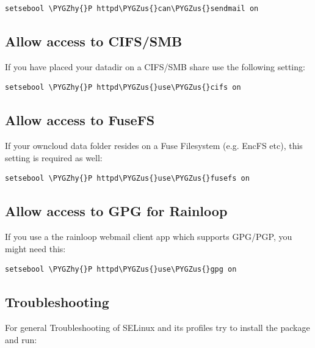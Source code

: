 \documentclass[letterpaper,10pt,english]{sphinxmanual}
\def\PYGZus{\char`\_}
\def\PYGZhy{\char`\-}
\begin{document}
\begin{Verbatim}[commandchars=\\\{\}]
setsebool \PYGZhy{}P httpd\PYGZus{}can\PYGZus{}sendmail on
\end{Verbatim}


\subsection{Allow access to CIFS/SMB}
\label{installation/selinux_configuration:allow-access-to-cifs-smb}
If you have placed your datadir on a CIFS/SMB share use the following setting:

\begin{Verbatim}[commandchars=\\\{\}]
setsebool \PYGZhy{}P httpd\PYGZus{}use\PYGZus{}cifs on
\end{Verbatim}


\subsection{Allow access to FuseFS}
\label{installation/selinux_configuration:allow-access-to-fusefs}
If your owncloud data folder resides on a Fuse Filesystem (e.g. EncFS etc), this setting is required as well:

\begin{Verbatim}[commandchars=\\\{\}]
setsebool \PYGZhy{}P httpd\PYGZus{}use\PYGZus{}fusefs on
\end{Verbatim}


\subsection{Allow access to GPG for Rainloop}
\label{installation/selinux_configuration:allow-access-to-gpg-for-rainloop}
If you use a the rainloop webmail client app which supports GPG/PGP, you might need this:

\begin{Verbatim}[commandchars=\\\{\}]
setsebool \PYGZhy{}P httpd\PYGZus{}use\PYGZus{}gpg on
\end{Verbatim}


\subsection{Troubleshooting}
\label{installation/selinux_configuration:troubleshooting}
For general Troubleshooting of SELinux and its profiles try to install the package  and run:
\end{document}
